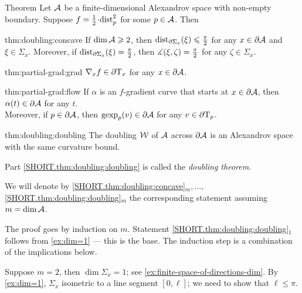 \begin{thm}{Theorem}\label{thm:doubling}
Let $\mathcal{A}$ be a finite-dimensional Alexandrov space with non-empty boundary.
Suppose $f\z=\tfrac12\cdot\distfun_p^2$ for some $p\in \mathcal{A}$.
Then

\begin{subthm}{thm:doubling:concave}
If $\operatorname{\rm dim}\nolimits \mathcal{A}\geqslant 2$, then
$\mathrm{dist}_{\partial \Sigma_x}(\xi)\leqslant \tfrac\pi2$ for any $x\in\partial \mathcal{A}$ and $\xi\in \Sigma_x$.
Moreover, if $\mathrm{dist}_{\partial \Sigma_x}(\xi)= \tfrac\pi2$, then $\measuredangle(\xi,\zeta)=\tfrac\pi2$ for any $\zeta\in \Sigma_x$.
\end{subthm}

\begin{subthm}{thm:partial-grad:grad}
$\nabla_xf\in \partial\mathrm{T}_x$ for any $x\in\partial \mathcal{A}$.
\end{subthm}

\begin{subthm}{thm:partial-grad:flow}
If $\alpha$ is an $f$-gradient curve that starts at $x\in \partial \mathcal{A}$, then $\alpha(t)\in \partial \mathcal{A}$ for any $t$.
\\
Moreover, if $p\in \partial \mathcal{A}$, then $\operatorname{\rm gexp}\nolimits_p(v)\in \partial \mathcal{A}$ for any $v\in\partial\mathrm{T}_p$.
\end{subthm}

\begin{subthm}{thm:doubling:doubling}
The doubling $\mathcal{W}$ of $\mathcal{A}$ across $\partial \mathcal{A}$ is an Alexandrov space with the same curvature bound.
\end{subthm}

\end{thm}

Part \ref{SHORT.thm:doubling:doubling} is called the \emph{doubling theorem}.

We will denote by 
\ref{SHORT.thm:doubling:concave}$_m,\dots,$\ref{SHORT.thm:doubling:doubling}$_m$ the corresponding statement assuming $m=\operatorname{\rm dim}\nolimits\mathcal{A}$.

The proof goes by induction on $m$.
Statement \ref{SHORT.thm:doubling:doubling}$_1$ follows from \ref{ex:dim=1} --- this is the base.
The induction step is a combination of the implications below.

Suppose $m=2$, then $\dim\Sigma_x=1$; see \ref{ex:finite-space-of-directions-dim}.
By \ref{ex:dim=1}, $\Sigma_x$ isometric to a line segment $[0,\ell]$;
we need to show that $\ell\le\pi$.

